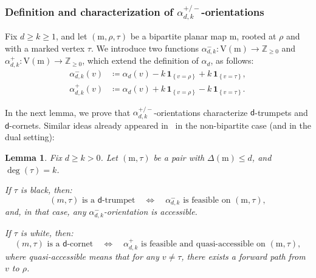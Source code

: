 \documentclass[11pt,reqno,tbtags]{amsart}
\renewcommand{\rm}{\mathrm{m}}
\newtheorem{lemm}[theo]{Lemma}
\numberwithin{equation}{section}
\numberwithin{theo}{section}
\theoremstyle{definition}
\newcommand{\dtrum}{$\mathsf{d}$-trumpet}
\newcommand{\dcorn}{$\mathsf{d}$-cornet}
\begin{document}
\subsubsection{Definition and characterization of $\alpha_{d,k}^{+/-}$-orientations}\label{sub:alpha+-}
Fix $d \geq k \geq 1$, and let $(\rm,\rho,\tau)$ be a bipartite planar map $\rm$, rooted at $\rho$ and with a marked vertex $\tau$. We introduce two functions $\alpha_{d,k}^-: \mathrm{V}(\rm)\rightarrow \mathbb{Z}_{\geq 0}$ and $\alpha_{d,k}^+ : \mathrm{V}(\rm)\rightarrow \mathbb{Z}_{\geq 0}$, which extend the definition of $\alpha_d$, as follows:
\begin{align}\label{eq:alphadk}
\alpha_{d,k}^-(v) &\coloneqq \alpha_{d}(v) - k\,\mathbf{1}_{\left\{v=\rho\right\}} + k\,\mathbf{1}_{\left\{v=\tau\right\}}, \\ \alpha_{d,k}^+(v) &\coloneqq \alpha_{d}(v) + k\,\mathbf{1}_{\left\{v=\rho\right\}}- k\,\mathbf{1}_{\left\{v=\tau\right\}}.
\end{align}

In the next lemma, we prove that $\alpha_{d,k}^{+/-}$-orientations characterize \dtrum s and \dcorn s. Similar ideas already appeared in~\cite[Proposition~19]{BernardiFusy_TrigQuadPent} in the non-bipartite case (and in the dual setting):
\begin{lemm}\label{lemm: Characterization tightness}
Fix $d\geq k >0$.  Let $(\rm,\tau)$ be a pair with $\Delta(\rm)\leq d$, and $\deg(\tau)=k$.

If $\tau$ is black, then: 
\[
	(m,\tau)\text{ is a \dtrum}\quad\Leftrightarrow\quad \alpha_{d,k}^-\text{ is feasible on }(\rm,\tau),
\]
and, in that case, any $\alpha_{d,k}^-$-orientation is accessible.

If $\tau$ is white, then: 
\[
	(m,\tau)\text{ is a \dcorn}\quad\Leftrightarrow\quad \alpha_{d,k}^+\text{ is feasible and quasi-accessible on }(\rm,\tau),
\]
where quasi-accessible means that for any $v\neq \tau$, there exists a forward path from $v$ to $\rho$. 
\end{lemm}
\end{document}
